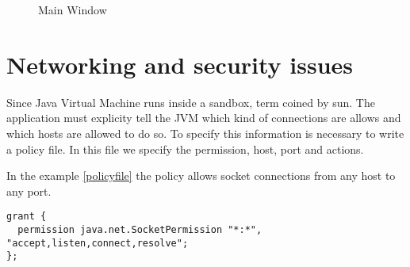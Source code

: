 \documentclass[times, 10pt,twocolumn]{article}
\begin{document}
\begin{figure} [H]
    \centering
    \caption{Main Window} 
    \label{fig:papinho1}
\end{figure}

\section{Networking and security issues}

Since Java Virtual Machine runs inside a sandbox, term coined by sun. The application must explicity tell the JVM which kind of connections are allows and which hosts are allowed to do so.
To specify this information is necessary to write a policy file. In this file we specify the permission, host, port and actions. 

In the example \ref{policyfile} the policy allows socket connections from any host to any port. 


\begin{lstlisting}[caption={Policy file},label=policyfile]
grant {
  permission java.net.SocketPermission "*:*", "accept,listen,connect,resolve";
};
\end{lstlisting}
\end{document}
